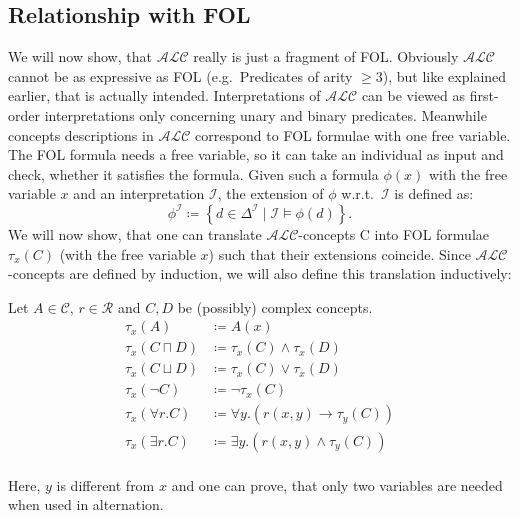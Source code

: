 
\subsection{Relationship with FOL}
We will now show, that $\mathcal{ALC}$ really is just a fragment of FOL.
Obviously $\mathcal{ALC}$ cannot be as expressive as FOL (e.g.\ Predicates of arity $ \geq 3$), but like explained earlier, that is actually intended.
\newline
Interpretations of $\mathcal{ALC}$ can be viewed as first-order interpretations only concerning unary and binary predicates.
Meanwhile concepts descriptions in $\mathcal{ALC}$ correspond to FOL formulae with one free variable. 
The FOL formula needs a free variable, so it can take an individual as input and check, whether it satisfies the formula.
\newline
Given such a formula $\phi (x)$ with the free variable $x$ and an interpretation $\mathcal{I}$, the extension of $\phi$ w.r.t.\ $\mathcal{I}$ is defined as:
\[
	\phi ^{\mathcal{I}} \coloneqq \left\{ d \in \Delta ^{\mathcal{I}} \mid \mathcal{I} \vDash \phi (d) \right\} 
.\]
We will now show, that one can translate $\mathcal{ALC}$-concepts C into FOL formulae $\tau_{x}(C)$ (with the free variable $x$) such that their extensions coincide.
Since $\mathcal{ALC}$-concepts are defined by induction, we will also define this translation inductively:

\begin{mdframed}
Let $A \in \mathscr{C}$, $r \in \mathscr{R}$ and $C, D$ be (possibly) complex concepts.
\begin{align*}
	\tau_{x}(A) &\coloneqq A(x) \\
	\tau_{x} \left( C \sqcap D \right) &\coloneqq \tau_{x}(C) \land \tau_{x}(D) \\
	\tau_{x} \left( C \sqcup D \right) &\coloneqq \tau_{x}(C) \lor \tau_{x}(D) \\
	\tau_{x} (\neg C) &\coloneqq \neg \tau_{x}(C) \\
	\tau_{x} \left( \forall r.C \right) &\coloneqq \forall y.(r(x,y) \rightarrow \tau_{y}(C)) \\
	\tau_{x} \left( \exists r.C \right) &\coloneqq \exists y.(r(x,y) \land \tau_{y}(C)) \\
\end{align*}
\end{mdframed}

\begin{note}
Here, $y$ is different from $x$ and one can prove, that only two variables are needed when used in alternation.
\end{note}

